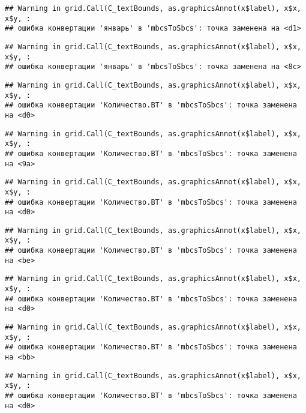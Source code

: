 \documentclass[
]{article}
\begin{document}
\begin{verbatim}
## Warning in grid.Call(C_textBounds, as.graphicsAnnot(x$label), x$x, x$y, :
## ошибка конвертации 'январь' в 'mbcsToSbcs': точка заменена на <d1>
\end{verbatim}

\begin{verbatim}
## Warning in grid.Call(C_textBounds, as.graphicsAnnot(x$label), x$x, x$y, :
## ошибка конвертации 'январь' в 'mbcsToSbcs': точка заменена на <8c>
\end{verbatim}

\begin{verbatim}
## Warning in grid.Call(C_textBounds, as.graphicsAnnot(x$label), x$x, x$y, :
## ошибка конвертации 'Количество.ВТ' в 'mbcsToSbcs': точка заменена на <d0>
\end{verbatim}

\begin{verbatim}
## Warning in grid.Call(C_textBounds, as.graphicsAnnot(x$label), x$x, x$y, :
## ошибка конвертации 'Количество.ВТ' в 'mbcsToSbcs': точка заменена на <9a>
\end{verbatim}

\begin{verbatim}
## Warning in grid.Call(C_textBounds, as.graphicsAnnot(x$label), x$x, x$y, :
## ошибка конвертации 'Количество.ВТ' в 'mbcsToSbcs': точка заменена на <d0>
\end{verbatim}

\begin{verbatim}
## Warning in grid.Call(C_textBounds, as.graphicsAnnot(x$label), x$x, x$y, :
## ошибка конвертации 'Количество.ВТ' в 'mbcsToSbcs': точка заменена на <be>
\end{verbatim}

\begin{verbatim}
## Warning in grid.Call(C_textBounds, as.graphicsAnnot(x$label), x$x, x$y, :
## ошибка конвертации 'Количество.ВТ' в 'mbcsToSbcs': точка заменена на <d0>
\end{verbatim}

\begin{verbatim}
## Warning in grid.Call(C_textBounds, as.graphicsAnnot(x$label), x$x, x$y, :
## ошибка конвертации 'Количество.ВТ' в 'mbcsToSbcs': точка заменена на <bb>
\end{verbatim}

\begin{verbatim}
## Warning in grid.Call(C_textBounds, as.graphicsAnnot(x$label), x$x, x$y, :
## ошибка конвертации 'Количество.ВТ' в 'mbcsToSbcs': точка заменена на <d0>
\end{verbatim}
\end{document}
